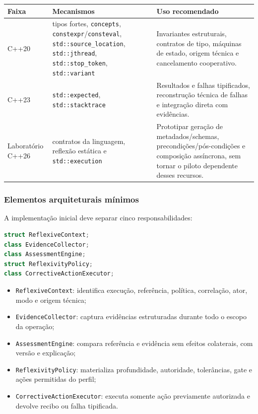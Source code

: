 \documentclass[11pt,a4paper,oneside]{article}
\begin{document}
\begin{tabularx}{\textwidth}{P{3.0cm}P{5.2cm}Y}
\toprule
\textbf{Faixa} & \textbf{Mecanismos} & \textbf{Uso recomendado} \\
\midrule
C++20 & tipos fortes, \texttt{concepts}, \texttt{constexpr}/\texttt{consteval}, \texttt{std::source\_location}, \texttt{std::jthread}, \texttt{std::stop\_token}, \texttt{std::variant} & Invariantes estruturais, contratos de tipo, máquinas de estado, origem técnica e cancelamento cooperativo. \\
C++23 & \texttt{std::expected}, \texttt{std::stacktrace} & Resultados e falhas tipificados, reconstrução técnica de falhas e integração direta com evidências. \\
Laboratório C++26 & contratos da linguagem, reflexão estática e \texttt{std::execution} & Prototipar geração de metadados/schemas, precondições/pós-condições e composição assíncrona, sem tornar o piloto dependente desses recursos. \\
\bottomrule
\end{tabularx}

\subsubsection{Elementos arquiteturais mínimos}
A implementação inicial deve separar cinco responsabilidades:
\begin{lstlisting}[language=C++]
struct ReflexiveContext;
class EvidenceCollector;
class AssessmentEngine;
struct ReflexivityPolicy;
class CorrectiveActionExecutor;
\end{lstlisting}

\begin{itemize}
  \item \texttt{ReflexiveContext}: identifica execução, referência, política, correlação, ator, modo e origem técnica;
  \item \texttt{EvidenceCollector}: captura evidências estruturadas durante todo o escopo da operação;
  \item \texttt{AssessmentEngine}: compara referência e evidência sem efeitos colaterais, com versão e explicação;
  \item \texttt{ReflexivityPolicy}: materializa profundidade, autoridade, tolerâncias, gate e ações permitidas do perfil;
  \item \texttt{CorrectiveActionExecutor}: executa somente ação previamente autorizada e devolve recibo ou falha tipificada.
\end{itemize}
\end{document}
